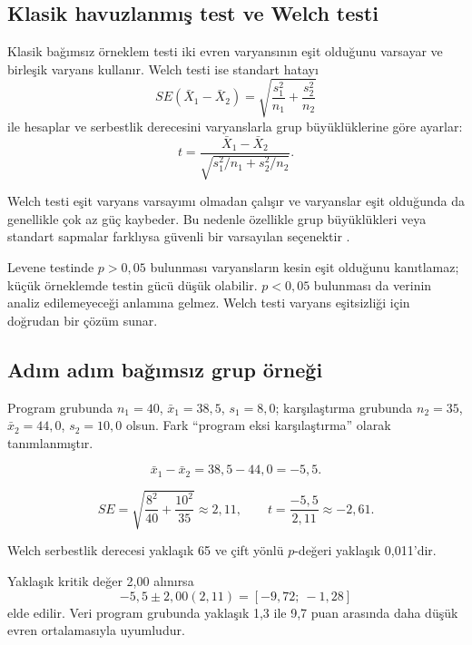 \subsection{Klasik havuzlanmış test ve Welch testi}

Klasik bağımsız örneklem testi iki evren varyansının eşit olduğunu varsayar ve
birleşik varyans kullanır. Welch testi ise standart hatayı
\[
SE(\bar X_1-\bar X_2)
=\sqrt{\frac{s_1^2}{n_1}+\frac{s_2^2}{n_2}}
\]
ile hesaplar ve serbestlik derecesini varyanslarla grup büyüklüklerine göre
ayarlar:
\[
t=\frac{\bar X_1-\bar X_2}
{\sqrt{s_1^2/n_1+s_2^2/n_2}}.
\]

Welch testi eşit varyans varsayımı olmadan çalışır ve varyanslar eşit olduğunda
da genellikle çok az güç kaybeder. Bu nedenle özellikle grup büyüklükleri veya
standart sapmalar farklıysa güvenli bir varsayılan seçenektir
\cite{maxwell2018}.

\begin{mistakebox}
Levene testinde $p>0{,}05$ bulunması varyansların kesin eşit olduğunu
kanıtlamaz; küçük örneklemde testin gücü düşük olabilir. $p<0{,}05$ bulunması
da verinin analiz edilemeyeceği anlamına gelmez. Welch testi varyans eşitsizliği
için doğrudan bir çözüm sunar.
\end{mistakebox}

\subsection{Adım adım bağımsız grup örneği}

Program grubunda $n_1=40$, $\bar x_1=38{,}5$, $s_1=8{,}0$; karşılaştırma
grubunda $n_2=35$, $\bar x_2=44{,}0$, $s_2=10{,}0$ olsun. Fark ``program
eksi karşılaştırma'' olarak tanımlanmıştır.

\[
\bar x_1-\bar x_2=38{,}5-44{,}0=-5{,}5.
\]

\[
SE=\sqrt{\frac{8^2}{40}+\frac{10^2}{35}}
\approx2{,}11,
\qquad
t=\frac{-5{,}5}{2{,}11}\approx-2{,}61.
\]

Welch serbestlik derecesi yaklaşık 65 ve çift yönlü $p$-değeri yaklaşık
0,011'dir.


Yaklaşık kritik değer 2,00 alınırsa
\[
-5{,}5\pm2{,}00(2{,}11)
=[-9{,}72;\ -1{,}28]
\]
elde edilir. Veri program grubunda yaklaşık 1,3 ile 9,7 puan arasında daha
düşük evren ortalamasıyla uyumludur.

